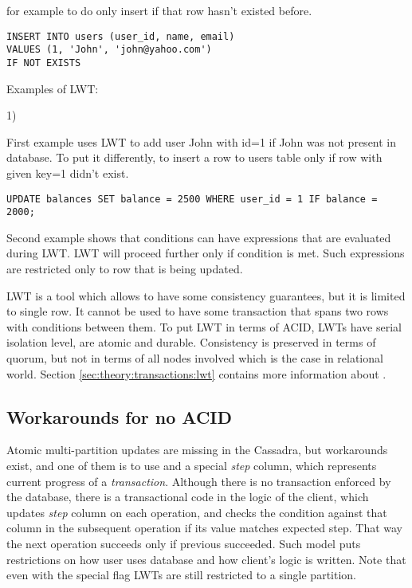 for example to do only insert if that row hasn’t existed before. 

\begin{example}
\begin{lstlisting}[style=outcode,label={lst:intro:lwtInsert},caption={LWT Insert with if not exists clause}]
INSERT INTO users (user_id, name, email)  
VALUES (1, 'John', 'john@yahoo.com') 
IF NOT EXISTS
\end{lstlisting}
\end{example}

Examples of LWT:

1)

First example uses LWT to add user John with id=1 if John was not present in database. To put it differently, to insert a row to users table only if row with given key=1 didn’t exist.



\begin{example}
\begin{lstlisting}[style=outcode,label={lst:intro:lwtUpdate},caption={LWT Update with column condition}]
UPDATE balances SET balance = 2500 WHERE user_id = 1 IF balance = 2000;
\end{lstlisting}
\end{example}

Second example shows that conditions can have expressions that are evaluated during LWT. LWT will proceed further only if condition is met. Such expressions are restricted only to row that is being updated.

LWT is a tool which allows to have some consistency guarantees, but it is limited to single row. It cannot be used to have some transaction that spans two rows with conditions between them. 
To put LWT in terms of ACID, LWTs have serial isolation level, are atomic and durable. Consistency is preserved in terms of quorum, but not in terms of all nodes involved which is the case in relational world. Section \ref{sec:theory:transactions:lwt} contains more information about \lwt.

\subsection{Workarounds for no ACID}
Atomic multi-partition updates are missing in the Cassadra, but workarounds exist, and one of them is to use \lwt and a special \emph{step} column, which represents current progress of a \emph{transaction}. Although there is no transaction enforced by the database, there is a transactional code in the logic of the client, which updates \emph{step} column on each operation, and checks the condition against that column in the subsequent operation if its value matches expected step. That way the next operation succeeds only if previous succeeded. Such model puts restrictions on how user uses database and how client's logic is written. Note that even with the special flag LWTs are still restricted to a single partition.  

